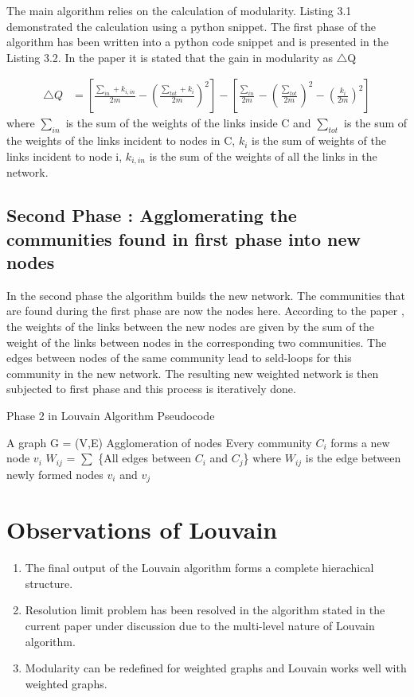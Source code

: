 \par The main algorithm relies on the calculation of modularity. Listing 3.1 demonstrated the calculation using a python snippet. The first phase of the algorithm has been written into a python code snippet and is presented in the Listing 3.2. 
In the paper it is stated that the gain in modularity as $\bigtriangleup$Q

\begin{equation}
\begin{split}
\bigtriangleup Q &= \left[ \frac{\sum_{in} + k_{i,in}}{2m} - \left( \frac{\sum_{tot} + k_{i}}{2m} \right)^2 \right] - \left[ \frac{\sum_{in}}{2m} - \left( \frac{\sum_{tot}}{2m} \right)^2 - \left( \frac{k_i}{2m} \right)^2 \right]
\end{split}
\end{equation}
where $\sum_{in}$ is the sum of the weights of the links inside C and $\sum_{tot}$ is the sum of the weights of the links incident to nodes in C, $k_i$ is the sum of weights of the links incident to node i, $k_{i,in}$ is the sum of the weights  of all the links in the network.

\subsection{Second Phase : Agglomerating the communities found in first phase into new nodes}
In the second phase the algorithm builds the new network. The communities that are found during the first phase are now the nodes here. According to the paper \cite{louvain}, the weights of the links between the new nodes are given by the sum of the weight of the links between nodes in the corresponding two communities. The edges between nodes of the same community lead to seld-loops for this community in the new network. The resulting new weighted network is then subjected to first phase  and this process is iteratively done. 
\begin{algorithm}[H]

\caption{Phase 2 in Louvain Algorithm Pseudocode}
\begin{algorithmic} 
\REQUIRE A graph G = (V,E)
\ENSURE Agglomeration of nodes
\STATE Every community $C_i$ forms a new node $v_i$
\STATE $W_{ij}$ = $\sum$ \{All edges between $C_i$ and $C_j$\} where $W_{ij}$ is the edge between newly formed nodes $v_i$ and $v_j$
\end{algorithmic}
\end{algorithm}
\section{Observations of Louvain}
\begin{enumerate}
\item The final output of the Louvain algorithm forms a complete hierachical structure.
\item Resolution limit problem \cite{ResolLimit} has been resolved in the algorithm stated in the current paper under discussion \cite{louvain} due to the multi-level nature of Louvain algorithm.
\item Modularity can be redefined for weighted graphs and Louvain works well with weighted graphs.
\end{enumerate}

